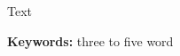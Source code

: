 \englishabstract

\parskip 10pt  \setlength{\parindent}{0pc}

Text

\textbf{Keywords:} three to five word